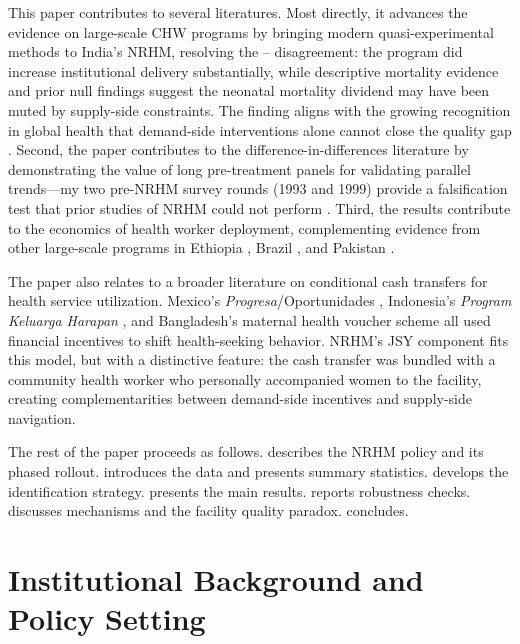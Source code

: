 \documentclass[12pt]{article}
\begin{document}
This paper contributes to several literatures. Most directly, it advances the evidence on large-scale CHW programs by bringing modern quasi-experimental methods to India's NRHM, resolving the \citet{lim2010india}--\citet{powell2015did} disagreement: the program did increase institutional delivery substantially, while descriptive mortality evidence and prior null findings suggest the neonatal mortality dividend may have been muted by supply-side constraints. The finding aligns with the growing recognition in global health that demand-side interventions alone cannot close the quality gap \citep{kruk2018lancet, das2012quality}. Second, the paper contributes to the difference-in-differences literature by demonstrating the value of long pre-treatment panels for validating parallel trends---my two pre-NRHM survey rounds (1993 and 1999) provide a falsification test that prior studies of NRHM could not perform \citep{roth2023pretest}. Third, the results contribute to the economics of health worker deployment, complementing evidence from other large-scale programs in Ethiopia \citep{workneh2013health}, Brazil \citep{macinko2006evaluation}, and Pakistan \citep{bhutta2011alma}.

The paper also relates to a broader literature on conditional cash transfers for health service utilization. Mexico's \emph{Progresa}/Oportunidades \citep{gertler2004progressing}, Indonesia's \emph{Program Keluarga Harapan} \citep{alatas2011targeting}, and Bangladesh's maternal health voucher scheme \citep{nguyen2012incentivizing} all used financial incentives to shift health-seeking behavior. NRHM's JSY component fits this model, but with a distinctive feature: the cash transfer was bundled with a community health worker who personally accompanied women to the facility, creating complementarities between demand-side incentives and supply-side navigation.

The rest of the paper proceeds as follows.  describes the NRHM policy and its phased rollout.  introduces the data and presents summary statistics.  develops the identification strategy.  presents the main results.  reports robustness checks.  discusses mechanisms and the facility quality paradox.  concludes.


\section{Institutional Background and Policy Setting}
\label{sec:background}
\end{document}
